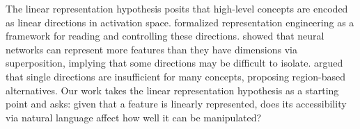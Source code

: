 The linear representation hypothesis \cite{park2024linear} posits that high-level concepts are encoded as linear directions in activation space. \citet{zou2023representation} formalized representation engineering as a framework for reading and controlling these directions. \citet{elhage2022superposition} showed that neural networks can represent more features than they have dimensions via superposition, implying that some directions may be difficult to isolate. \citet{shafran2026directions} argued that single directions are insufficient for many concepts, proposing region-based alternatives. Our work takes the linear representation hypothesis as a starting point and asks: given that a feature is linearly represented, does its accessibility via natural language affect how well it can be manipulated?
